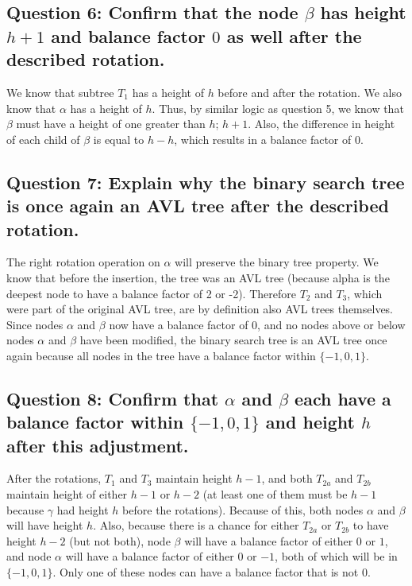 \documentclass[a4paper, 12pt, titlepage]{article}
\begin{document}
\subsection*{Question 6: Confirm that the node $\beta$ has height $h+1$ and balance factor $0$ as well after the described rotation.} 

We know that subtree $T_1$ has a height of $h$ before and after the rotation.
We also know that $\alpha$ has a height of $h$.
Thus,
by similar logic as question 5,
we know that $\beta$ must have a height of one greater than $h$;
$h+1$.
Also,
the difference in height of each child of $\beta$ is equal to $h-h$,
which results in a balance factor of $0$.

\subsection*{Question 7: Explain why the binary search tree is once again an AVL tree after the described rotation.} 

The right rotation operation on $\alpha$ will preserve the binary tree property.
We know that before the insertion,
the tree was an AVL tree
(because alpha is the deepest node to have a balance factor of 2 or -2).
Therefore $T_2$ and $T_3$,
which were part of the original AVL tree,
are by definition also AVL trees themselves.
Since nodes $\alpha$ and $\beta$ now have a balance factor of $0$,
and no nodes above or below nodes $\alpha$ and $\beta$ have been modified,
the binary search tree is an AVL tree once again because all nodes in the tree have a balance factor within $\{-1, 0, 1\}$.

\subsection*{Question 8: Confirm that $\alpha$ and $\beta$ each have a balance factor within $\{-1, 0, 1\}$ and height $h$ after this adjustment.} 

After the rotations,
$T_1$ and $T_3$ maintain height $h-1$,
and both $T_{2a}$ and $T_{2b}$ maintain height of either $h-1$ or $h-2$
(at least one of them must be $h-1$ because $\gamma$ had height $h$ before the rotations).
Because of this,
both nodes $\alpha$ and $\beta$ will have height $h$.
Also,
because there is a chance for either $T_{2a}$ or $T_{2b}$ to have height $h-2$
(but not both),
node $\beta$ will have a balance factor of either $0$ or $1$,
and node $\alpha$ will have a balance factor of either $0$ or $-1$,
both of which will be in $\{-1, 0, 1\}$.
Only one of these nodes can have a balance factor that is not $0$.
\end{document}
